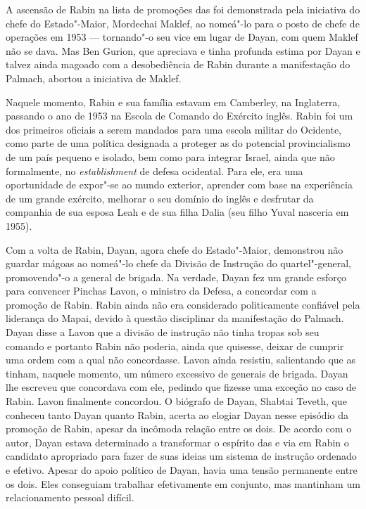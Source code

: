 A ascensão de Rabin na lista de promoções das  foi demonstrada pela
iniciativa do chefe do Estado"-Maior, Mordechai Maklef, ao nomeá"-lo
para o posto de chefe de operações em 1953 --- tornando"-o seu vice em lugar
de Dayan, com quem Maklef não se dava. Mas Ben Gurion, que apreciava e
tinha profunda estima por Dayan e talvez ainda magoado com a
desobediência de Rabin durante a manifestação do Palmach, abortou a
iniciativa de Maklef.

Naquele momento, Rabin e sua família estavam em Camberley, na Inglaterra,
passando o ano de 1953 na Escola de Comando do Exército inglês. Rabin
foi um dos primeiros oficiais a serem mandados para uma escola militar
do Ocidente, como parte de uma política designada a proteger as  do
potencial provincialismo de um país pequeno e isolado, bem como para integrar Israel,
ainda que não formalmente, no \emph{establishment} de defesa
ocidental. Para ele, era uma oportunidade de expor"-se ao mundo
exterior, aprender com base na experiência de um grande exército,
melhorar o seu domínio do inglês e desfrutar da companhia de sua esposa
Leah e de sua filha Dalia (seu filho Yuval nasceria em 1955).

Com a volta de Rabin, Dayan, agora chefe do Estado"-Maior,
demonstrou não guardar mágoas ao nomeá"-lo chefe da Divisão de Instrução
do quartel"-general, promovendo"-o a general de brigada. Na verdade, Dayan
fez um grande esforço para convencer Pinchas Lavon, o ministro da
Defesa, a concordar com a promoção de Rabin. Rabin ainda não era considerado
politicamente confiável pela liderança do Mapai, devido à questão
disciplinar da manifestação do Palmach. Dayan disse a Lavon que a
divisão de instrução não tinha tropas sob seu comando e portanto Rabin
não poderia, ainda que quisesse, deixar de cumprir uma ordem com a qual
não concordasse. Lavon ainda resistiu, salientando que as  tinham,
naquele momento, um número excessivo de generais de brigada. Dayan lhe
escreveu que concordava com ele, pedindo que fizesse uma exceção no caso
de Rabin. Lavon finalmente concordou. O biógrafo de Dayan, Shabtai
Teveth, que conheceu tanto Dayan quanto Rabin, acerta ao elogiar Dayan
nesse episódio da promoção de Rabin, apesar da incômoda relação entre os
dois. De acordo com o autor, Dayan estava determinado a transformar o
espírito das  e via em Rabin o candidato apropriado para fazer de
suas ideias um sistema de instrução ordenado e efetivo. Apesar do
apoio político de Dayan, havia uma tensão permanente entre os dois. Eles
conseguiam trabalhar efetivamente em conjunto, mas mantinham um
relacionamento pessoal difícil.

